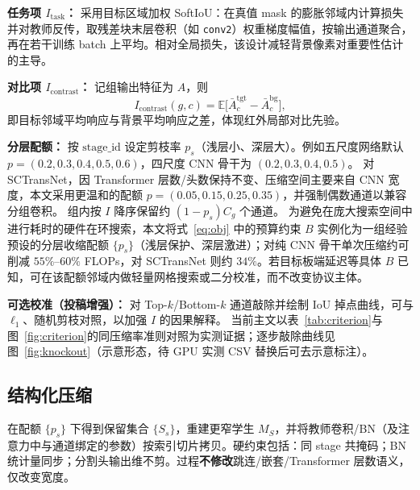 \documentclass[lettersize,journal]{IEEEtran}
\begin{document}
\textbf{任务项 $I_{\mathrm{task}}$：}
采用目标区域加权 SoftIoU：在真值 mask 的膨胀邻域内计算损失并对教师反传，取残差块末层卷积（如 \texttt{conv2}）权重梯度幅值，按输出通道聚合，再在若干训练 batch 上平均。相对全局损失，该设计减轻背景像素对重要性估计的主导。

\textbf{对比项 $I_{\mathrm{contrast}}$：}
记组输出特征为 $A$，则
\begin{equation}
\label{eq:contrast}
I_{\mathrm{contrast}}(g,c)=\mathbb{E}\!\big[\bar{A}_{c}^{\mathrm{tgt}}-\bar{A}_{c}^{\mathrm{bg}}\big],
\end{equation}
即目标邻域平均响应与背景平均响应之差，体现红外局部对比先验。

\textbf{分层配额：}
按 $\mathrm{stage\_id}$ 设定剪枝率 $p_s$（浅层小、深层大）。例如五尺度网络默认
$p=(0.2,0.3,0.4,0.5,0.6)$，四尺度 CNN 骨干为 $(0.2,0.3,0.4,0.5)$。
对 SCTransNet，因 Transformer 层数/头数保持不变、压缩空间主要来自 CNN 宽度，本文采用更温和的配额 $p=(0.05,0.15,0.25,0.35)$，并强制偶数通道以兼容分组卷积。
组内按 $I$ 降序保留约 $(1-p_s)C_g$ 个通道。
为避免在庞大搜索空间中进行耗时的硬件在环搜索，本文将式~\eqref{eq:obj} 中的预算约束 $B$ 实例化为一组经验预设的分层收缩配额 $\{p_s\}$（浅层保护、深层激进）；对纯 CNN 骨干单次压缩约可削减 $55\%$--$60\%$ FLOPs，对 SCTransNet 则约 $34\%$。若目标板端延迟等具体 $B$ 已知，可在该配额邻域内做轻量网格搜索或二分校准，而不改变协议主体。

\textbf{可选校准（投稿增强）：}
对 Top-$k$/Bottom-$k$ 通道敲除并绘制 IoU 掉点曲线，可与 $\ell_1$、随机剪枝对照，以加强 $I$ 的因果解释。
当前主文以表~\ref{tab:criterion}与图~\ref{fig:criterion}的同压缩率准则对照为实测证据；逐步敲除曲线见图~\ref{fig:knockout}（示意形态，待 GPU 实测 CSV 替换后可去示意标注）。

\subsection{结构化压缩}
\label{sec:prune}
在配额 $\{p_s\}$ 下得到保留集合 $\{S_s\}$，重建更窄学生 $M_S$，并将教师卷积/BN（及注意力中与通道绑定的参数）按索引切片拷贝。硬约束包括：同 stage 共掩码；BN 统计量同步；分割头输出维不剪。过程\textbf{不修改}跳连/嵌套/Transformer 层数语义，仅改变宽度。
\end{document}
